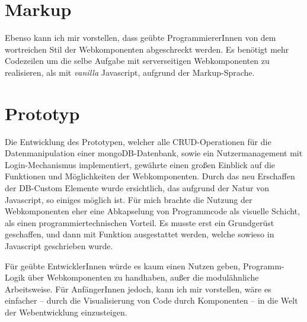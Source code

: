 \section{Markup}
Ebenso kann ich mir vorstellen, dass geübte ProgrammiererInnen von dem wortreichen Stil der Webkomponenten abgeschreckt werden. Es benötigt mehr Codezeilen um die selbe Aufgabe mit serverseitigen Webkomponenten zu realisieren, als mit \textit{vanilla} Javascript, aufgrund der Markup-Sprache.

\section{Prototyp}
Die Entwicklung des Prototypen, welcher alle CRUD-Operationen für die Datenmanipulation einer mongoDB-Datenbank, sowie ein Nutzermanagement mit Login-Mechanismus implementiert, gewährte einen großen Einblick auf die Funktionen und Möglichkeiten der Webkomponenten. Durch das neu Erschaffen der DB-Custom Elemente wurde ersichtlich, das aufgrund der Natur von Javascript, so einiges möglich ist. Für mich brachte die Nutzung der Webkomponenten eher eine Abkapselung von Programmcode als visuelle Schicht, als einen programmiertechnischen Vorteil. Es musste erst ein Grundgerüst geschaffen, und dann mit Funktion ausgestattet werden, welche sowieso in Javascript geschrieben wurde. 

Für geübte EntwicklerInnen würde es kaum einen Nutzen geben, Programm-Logik über Webkomponenten zu handhaben, außer die modulähnliche Arbeitsweise. Für AnfängerInnen jedoch, kann ich mir vorstellen, wäre es einfacher -- durch die Visualisierung von Code durch Komponenten -- in die Welt der Webentwicklung einzusteigen. 